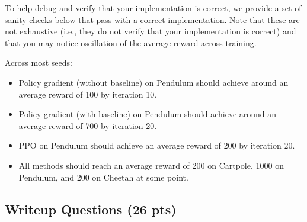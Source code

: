 \documentclass{article}
\begin{document}
To help debug and verify that your implementation is correct, we provide a set of sanity checks below that pass with a correct implementation. Note that these are not exhaustive (i.e., they do not verify that your implementation is correct) and that you may notice oscillation of the average reward across training.

Across most seeds:
\begin{itemize}
    \item Policy gradient (without baseline) on Pendulum should achieve around an average reward of 100 by iteration 10.
    \item Policy gradient (with baseline) on Pendulum should achieve around an average reward of 700 by iteration 20.
    \item PPO on Pendulum should achieve an average reward of 200 by iteration 20.
    \item All methods should reach an average reward of 200 on Cartpole, 1000 on Pendulum, and 200 on Cheetah at some point.
\end{itemize}

\subsection{Writeup Questions (26 pts)}
\end{document}
